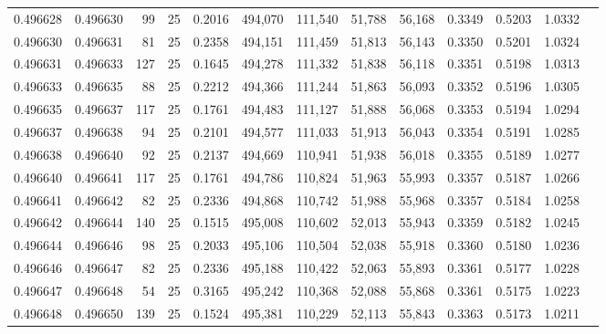 \begin{tabular}{rrrrrrrrrrrrr}
0.496628 & 0.496630 &    99 &  25 &                                     0.2016 & 494,070 & 111,540 &  51,788 &  56,168 & 0.3349 & 0.5203 & 1.0332 \\
0.496630 & 0.496631 &    81 &  25 &                                     0.2358 & 494,151 & 111,459 &  51,813 &  56,143 & 0.3350 & 0.5201 & 1.0324 \\
0.496631 & 0.496633 &   127 &  25 &                                     0.1645 & 494,278 & 111,332 &  51,838 &  56,118 & 0.3351 & 0.5198 & 1.0313 \\
0.496633 & 0.496635 &    88 &  25 &                                     0.2212 & 494,366 & 111,244 &  51,863 &  56,093 & 0.3352 & 0.5196 & 1.0305 \\
0.496635 & 0.496637 &   117 &  25 &                                     0.1761 & 494,483 & 111,127 &  51,888 &  56,068 & 0.3353 & 0.5194 & 1.0294 \\
0.496637 & 0.496638 &    94 &  25 &                                     0.2101 & 494,577 & 111,033 &  51,913 &  56,043 & 0.3354 & 0.5191 & 1.0285 \\
0.496638 & 0.496640 &    92 &  25 &                                     0.2137 & 494,669 & 110,941 &  51,938 &  56,018 & 0.3355 & 0.5189 & 1.0277 \\
0.496640 & 0.496641 &   117 &  25 &                                     0.1761 & 494,786 & 110,824 &  51,963 &  55,993 & 0.3357 & 0.5187 & 1.0266 \\
0.496641 & 0.496642 &    82 &  25 &                                     0.2336 & 494,868 & 110,742 &  51,988 &  55,968 & 0.3357 & 0.5184 & 1.0258 \\
0.496642 & 0.496644 &   140 &  25 &                                     0.1515 & 495,008 & 110,602 &  52,013 &  55,943 & 0.3359 & 0.5182 & 1.0245 \\
0.496644 & 0.496646 &    98 &  25 &                                     0.2033 & 495,106 & 110,504 &  52,038 &  55,918 & 0.3360 & 0.5180 & 1.0236 \\
0.496646 & 0.496647 &    82 &  25 &                                     0.2336 & 495,188 & 110,422 &  52,063 &  55,893 & 0.3361 & 0.5177 & 1.0228 \\
0.496647 & 0.496648 &    54 &  25 &                                     0.3165 & 495,242 & 110,368 &  52,088 &  55,868 & 0.3361 & 0.5175 & 1.0223 \\
0.496648 & 0.496650 &   139 &  25 &                                     0.1524 & 495,381 & 110,229 &  52,113 &  55,843 & 0.3363 & 0.5173 & 1.0211 \\

\end{tabular}
